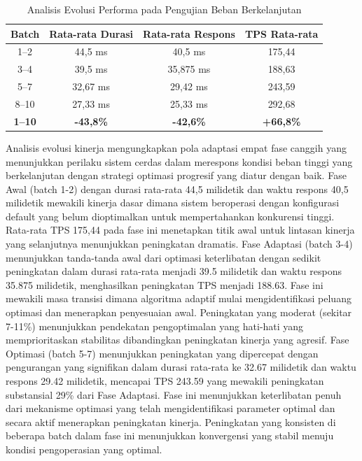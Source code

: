 \begin{table}[h!]
  \centering
  \begin{tabular}{|c|c|c|c|}
    \hline
    \textbf{Batch} & \textbf{Rata-rata Durasi} & \textbf{Rata-rata Respons} & \textbf{TPS Rata-rata} \\
    \hline
    1–2            & 44,5 ms                   & 40,5 ms                    & 175,44                 \\
    \hline
    3–4            & 39,5 ms                   & 35,875 ms                  & 188,63                 \\
    \hline
    5–7            & 32,67 ms                  & 29,42 ms                   & 243,59                 \\
    \hline
    8–10           & 27,33 ms                  & 25,33 ms                   & 292,68                 \\
    \hline
    \hline
    \textbf{1–10}  & \textbf{-43,8\%}          & \textbf{-42,6\%}           & \textbf{+66,8\%}       \\
    \hline
  \end{tabular}
  \caption{Analisis Evolusi Performa pada Pengujian Beban Berkelanjutan}
  \label{tab:sustained_load_evolution}
\end{table}
Analisis evolusi kinerja mengungkapkan pola adaptasi empat fase canggih yang menunjukkan perilaku sistem cerdas dalam merespons kondisi beban tinggi yang berkelanjutan dengan strategi optimasi progresif yang diatur dengan baik. Fase Awal (batch 1-2) dengan durasi rata-rata 44,5 milidetik dan waktu respons 40,5 milidetik mewakili kinerja dasar dimana sistem beroperasi dengan konfigurasi default yang belum dioptimalkan untuk mempertahankan konkurensi tinggi. Rata-rata TPS 175,44 pada fase ini menetapkan titik awal untuk lintasan kinerja yang selanjutnya menunjukkan peningkatan dramatis.
Fase Adaptasi (batch 3-4) menunjukkan tanda-tanda awal dari optimasi keterlibatan dengan sedikit peningkatan dalam durasi rata-rata menjadi 39.5 milidetik dan waktu respons 35.875 milidetik, menghasilkan peningkatan TPS menjadi 188.63. Fase ini mewakili masa transisi dimana algoritma adaptif mulai mengidentifikasi peluang optimasi dan menerapkan penyesuaian awal. Peningkatan yang moderat (sekitar 7-11\%) menunjukkan pendekatan pengoptimalan yang hati-hati yang memprioritaskan stabilitas dibandingkan peningkatan kinerja yang agresif.
Fase Optimasi (batch 5-7) menunjukkan peningkatan yang dipercepat dengan pengurangan yang signifikan dalam durasi rata-rata ke 32.67 milidetik dan waktu respons 29.42 milidetik, mencapai TPS 243.59 yang mewakili peningkatan substansial 29\% dari Fase Adaptasi. Fase ini menunjukkan keterlibatan penuh dari mekanisme optimasi yang telah mengidentifikasi parameter optimal dan secara aktif menerapkan peningkatan kinerja. Peningkatan yang konsisten di beberapa batch dalam fase ini menunjukkan konvergensi yang stabil menuju kondisi pengoperasian yang optimal.
